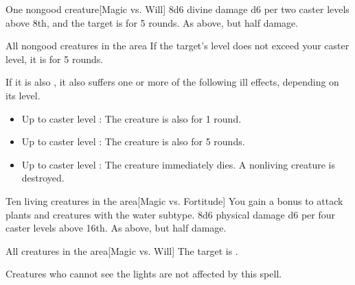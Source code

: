 \spellrng{\rngmed}
\begin{spelltarget}{One nongood creature}[Magic vs. Will]
    \spellsuccess 8d6 divine damage \add d6 per two caster levels above 8th, and the target is \bewildered for 5 rounds.
    \spellfailure As above, but half damage.
\end{spelltarget}

\begin{spelltargets}{All nongood creatures in the area}
    \spelleffect If the target's level does not exceed your caster level, it is \deafened for 5 rounds.

    If it is also \bloodied, it also suffers one or more of the following ill effects, depending on its level.
    \begin{itemize}
        \item Up to caster level : The creature is also \blinded for 1 round.
        \item Up to caster level : The creature is also \paralyzed for 5 rounds.
        \item Up to caster level : The creature immediately dies. A nonliving creature is destroyed.
    \end{itemize}
\end{spelltargets}

\begin{spelltargets}{Ten living creatures in the area}[Magic vs. Fortitude]
    \spellspecial You gain a  bonus to attack plants and creatures with the water subtype.
    \spellsuccess 8d6 physical damage \add d6 per four caster levels above 16th.
    \spellfailure As above, but half damage.
\end{spelltargets}

\spelldur{\durshort}
\begin{spelltarget}{All creatures in the area}[Magic vs. Will]
    \spellsuccess The target is \fascinated.
\end{spelltarget}
\spellnotes Creatures who cannot see the lights are not affected by this spell.


